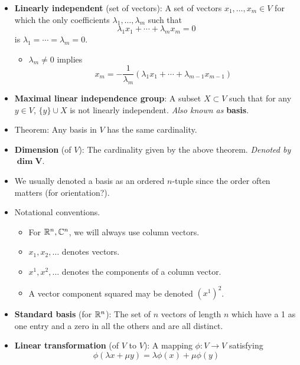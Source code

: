\documentclass[../notes.tex]{subfiles}
\begin{document}
\begin{itemize}
\begin{itemize}
    \end{itemize}
    \item \textbf{Linearly independent} (set of vectors): A set of vectors $x_1,\dots,x_m\in V$ for which the only coefficients $\lambda_1,\dots,\lambda_m$ such that
    \begin{equation*}
        \lambda_1x_1+\cdots+\lambda_mx_m = 0
    \end{equation*}
    is $\lambda_1=\cdots=\lambda_m=0$.
    \begin{itemize}
        \item $\lambda_m\neq 0$ implies
        \begin{equation*}
            x_m = -\frac{1}{\lambda_m}(\lambda_1x_1+\cdots+\lambda_{m-1}x_{m-1})
        \end{equation*}
    \end{itemize}
    \item \textbf{Maximal linear independence group}: A subset $X\subset V$ such that for any $y\in V$, $\{y\}\cup X$ is not linearly independent. \emph{Also known as} \textbf{basis}.
    \item Theorem: Any basis in $V$ has the same cardinality.
    \item \textbf{Dimension} (of $V$): The cardinality given by the above theorem. \emph{Denoted by} $\bm{\dim V}$.
    \item We usually denoted a basis as an ordered $n$-tuple since the order often matters (for orientation?).
    \item Notational conventions.
    \begin{itemize}
        \item For $\mathbb{R}^n,\mathbb{C}^n$, we will always use column vectors.
        \item $x_1,x_2,\dots$ denotes vectors.
        \item $x^1,x^2,\dots$ denotes the components of a column vector.
        \item A vector component squared may be denoted $(x^1)^2$.
    \end{itemize}
    \item \textbf{Standard basis} (for $\mathbb{R}^n$): The set of $n$ vectors of length $n$ which have a 1 as one entry and a zero in all the others and are all distinct.
    \item \textbf{Linear transformation} (of $V$ to $V$): A mapping $\phi:V\to V$ satisfying
    \begin{equation*}
        \phi(\lambda x+\mu y) = \lambda\phi(x)+\mu\phi(y)
    \end{equation*}

\end{itemize}
\end{document}
